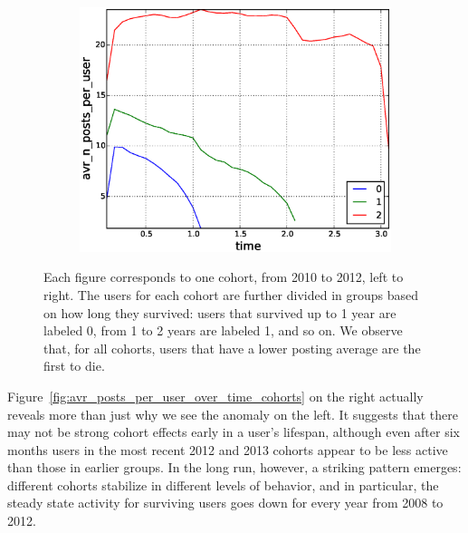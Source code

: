 \begin{figure}[!tb]
\begin{subfigure}{.3\textwidth}\includegraphics[scale=0.25]{./images/avr_posts_per_user_for_surviving_year_for_2012.eps}\caption{}\end{subfigure}
\caption{Each figure corresponds to one cohort, from 2010 to 2012, left to right. The users for each cohort are further divided in groups based on how long they survived: users that survived up to 1 year are labeled 0, from 1 to 2 years are labeled 1, and so on. We observe that, for all cohorts, users that have a lower posting average are the first to die.}
\label{fig:avr_posts_per_user_for_surviving_year}
\end{figure}


Figure~\ref{fig:avr_posts_per_user_over_time_cohorts} on the right actually reveals more than just why we see the anomaly on the left. It suggests that there may not be strong cohort effects early in a user's lifespan, although even after six months users in the most recent 2012 and 2013 cohorts appear to be less active than those in earlier groups.  In the long run, however, a striking pattern emerges: different cohorts stabilize in different levels of behavior, and in particular, the steady state activity for surviving users goes down for every year from 2008 to 2012.

